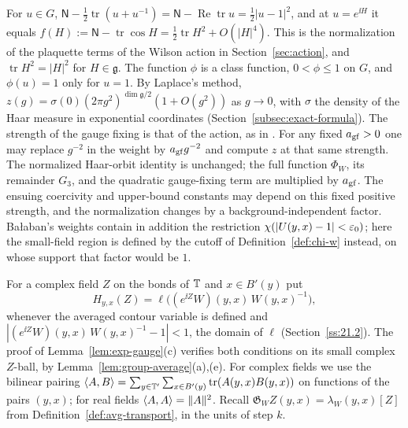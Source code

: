 For $u\in G$, $\mathsf N-\frac12\operatorname{tr}(u+u^{-1})=\mathsf N-\operatorname{Re}\operatorname{tr}u=\frac12|u-1|^2$, and at $u=e^{\ii H}$ it equals $f(H):=\mathsf N-\operatorname{tr}\cos H=\frac12\operatorname{tr}H^2+O(|H|^4)$. This is the normalization of the plaquette terms of the Wilson action in Section~\ref{sec:action}, and $\operatorname{tr}H^2=|H|^2$ for $H\in\mathfrak g$. The function $\phi$ is a class function, $0<\phi\le1$ on $G$, and $\phi(u)=1$ only for $u=1$. By Laplace's method, $z(g)=\sigma(0)(2\pi g^2)^{\dim\mathfrak g/2}(1+O(g^2))$ as $g\to0$, with $\sigma$ the density of the Haar measure in exponential coordinates (Section~\ref{subsec:exact-formula}). The strength of the gauge fixing is that of the action, as in \cite[(0.19)]{BalYM4I}. For any fixed $a_{\rm gf}>0$ one may replace $g^{-2}$ in the weight by $a_{\rm gf}g^{-2}$ and compute $z$ at that same strength. The normalized Haar-orbit identity is unchanged; the full function $\Phi_W$, its remainder $G_3$, and the quadratic gauge-fixing term are multiplied by $a_{\rm gf}$. The ensuing coercivity and upper-bound constants may depend on this fixed positive strength, and the normalization changes by a background-independent factor. Ba\l aban's weights contain in addition the restriction $\chi(|U(y,x)-1|<\varepsilon_0)$; here the small-field region is defined by the cutoff of Definition~\ref{def:chi-w} instead, on whose support that factor would be $1$.

For a complex field $Z$ on the bonds of $\mathbb T$ and $x\in B'(y)$ put
\[
H_{y,x}(Z)=\ell\big((e^{\ii Z}W)(y,x)\,W(y,x)^{-1}\big),
\]
whenever the averaged contour variable is defined and $|(e^{\ii Z}W)(y,x)\,W(y,x)^{-1}-1|<1$, the domain of $\ell$ (Section~\ref{ss:21.2}). The proof of Lemma~\ref{lem:exp-gauge}(c) verifies both conditions on its small complex $Z$-ball, by Lemma~\ref{lem:group-average}(a),(e). For complex fields we use the bilinear pairing $\langle A,B\rangle=\sum_{y\in\mathbb T'}\sum_{x\in B'(y)}\operatorname{tr}(A(y,x)B(y,x))$ on functions of the pairs $(y,x)$; for real fields $\langle A,A\rangle=\|A\|^2$. Recall $\mathfrak G_WZ(y,x)=\lambda_W(y,x)[Z]$ from Definition~\ref{def:avg-transport}, in the units of step $k$.

